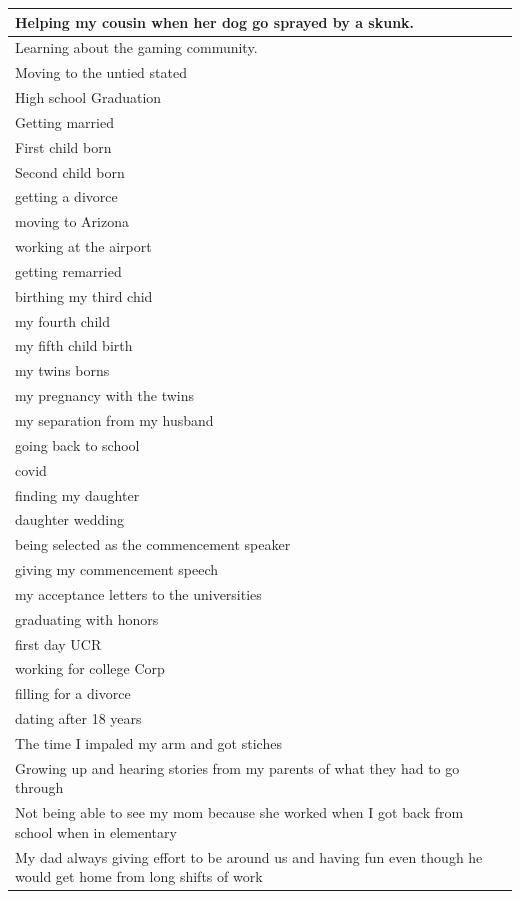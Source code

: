 \documentclass[
  .7em,
  letterpaper,
  DIV=11,
  numbers=noendperiod]{scrartcl}
\begin{document}
\begin{table}
\begin{tabular}{l}
\hline
Helping my cousin when her dog go sprayed by a skunk.\\
\hline
Learning about the gaming community.\\
\hline
Moving to the untied stated\\
\hline
High school Graduation\\
\hline
Getting married\\
\hline
First child born\\
\hline
Second child born\\
\hline
getting a divorce\\
\hline
moving to Arizona\\
\hline
working at the airport\\
\hline
getting remarried\\
\hline
birthing my third chid\\
\hline
my fourth child\\
\hline
my fifth child birth\\
\hline
my twins borns\\
\hline
my pregnancy with the twins\\
\hline
my separation from my husband\\
\hline
going back to school\\
\hline
covid\\
\hline
finding my daughter\\
\hline
daughter wedding\\
\hline
being selected as the commencement speaker\\
\hline
giving my commencement speech\\
\hline
my acceptance letters to the universities\\
\hline
graduating with honors\\
\hline
first day UCR\\
\hline
working for college Corp\\
\hline
filling for a divorce\\
\hline
dating after 18 years\\
\hline
The time I impaled my arm and got stiches\\
\hline
Growing up and hearing stories from my parents of what they had to go through\\
\hline
Not being able to see my mom because she worked when I got back from school when in elementary\\
\hline
My dad always giving effort to be around us and having fun even though he would get home from long shifts of work\\

\end{tabular}
\end{table}
\end{document}
